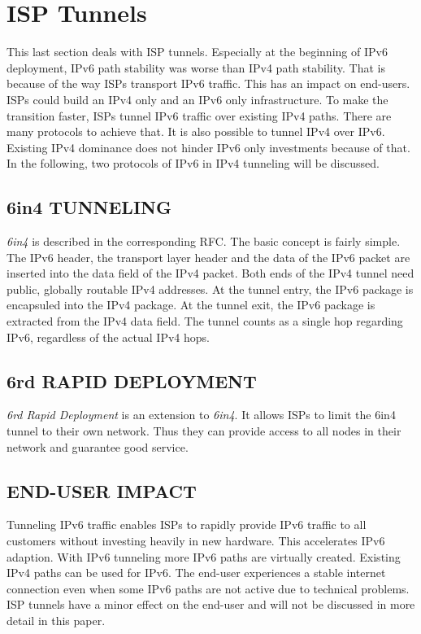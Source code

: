 \documentclass[format=sigconf, natbib=true, nonacm=true]{acmart}
\begin{document}
    \section{ISP Tunnels}
    This last section deals with ISP tunnels. Especially at the beginning of IPv6 deployment, IPv6 path stability was worse than IPv4 path stability\cite{7119767}. That is because of the way ISPs transport IPv6 traffic. This has an impact on end-users. ISPs could build an IPv4 only and an IPv6 only infrastructure. To make the transition faster, ISPs tunnel IPv6 traffic over existing IPv4 paths. There are many protocols to achieve that. It is also possible to tunnel IPv4 over IPv6. Existing IPv4 dominance does not hinder IPv6 only investments because of that. In the following, two protocols of IPv6 in IPv4 tunneling will be discussed.
    \subsection{6in4 TUNNELING}
    \textit{6in4} is described in the corresponding RFC\cite{rfc4213}. The basic concept is fairly simple. The IPv6 header, the transport layer header and the data of the IPv6 packet are inserted into the data field of the IPv4 packet. Both ends of the IPv4 tunnel need public, globally routable IPv4 addresses. At the tunnel entry, the IPv6 package is encapsuled into the IPv4 package. At the tunnel exit, the IPv6 package is extracted from the IPv4 data field. The tunnel counts as a single hop regarding IPv6, regardless of the actual IPv4 hops.
    \subsection{6rd RAPID DEPLOYMENT}
    \textit{6rd Rapid Deployment} is an extension to \textit{6in4}. It allows ISPs to limit the 6in4 tunnel to their own network. Thus they can provide access to all nodes in their network and guarantee good service.
    \subsection*{END-USER IMPACT}
    Tunneling IPv6 traffic enables ISPs to rapidly provide IPv6 traffic to all customers without investing heavily in new hardware. This accelerates IPv6 adaption. With IPv6 tunneling more IPv6 paths are virtually created. Existing IPv4 paths can be used for IPv6. The end-user experiences a stable internet connection even when some IPv6 paths are not active due to technical problems. ISP tunnels have a minor effect on the end-user and will not be discussed in more detail in this paper.
\end{document}
